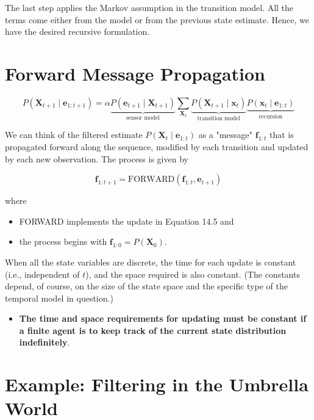 \documentclass[11pt]{article}
\begin{document}
The last step applies the Markov assumption in the transition model.  All the terms come either from the model or from the previous state estimate.
Hence, we have the desired recursive formulation.
\section{Forward Message Propagation}
\label{sec:org124e659}

\vspace{-.2in}
\[
P(\bm{X}_{t+1} \mid \bm{e}_{1:t+1}) = \alpha \underbrace{P(\bm{e}_{t+1} \mid \bm{X}_{t+1})}_{\text{sensor model}} \sum_{\bm{X}_t} \underbrace{P(\bm{X}_{t+1} \mid \bm{x}_t)}_{\text{transition model}} \underbrace{P(\bm{x}_t \mid \bm{e}_{1:t})}_{\text{recursion}} \tag{14.5}
\]

We can think of the filtered estimate \(P(\bm{X}_t \mid \bm{e}_{1:t})\) as a "message" \(\bm{f}_{1:t}\) that is propagated forward along the sequence, modified by each transition and updated by each new observation. The process is given by

\begin{equation*}
\bm{f}_{1:t+1} = \text{FORWARD}(\bm{f}_{1:t}, \bm{e}_{t+1})
\end{equation*}

where

\begin{itemize}
\item FORWARD implements the update in Equation 14.5 and
\item the process begins with \(\bm{f}_{1:0} = P(\bm{X}_0)\).
\end{itemize}

When all the state variables are discrete, the time for each update is constant (i.e., independent of \(t\)), and the space required is also constant. (The constants depend, of course, on the size of the state space and the specific type of the temporal model in question.)

\begin{itemize}
\item \textbf{The time and space requirements for updating must be constant if a finite agent is to keep track of the current state distribution indefinitely}.
\end{itemize}
\section{Example: Filtering in the Umbrella World}
\label{sec:orgf9e840f}
\end{document}
